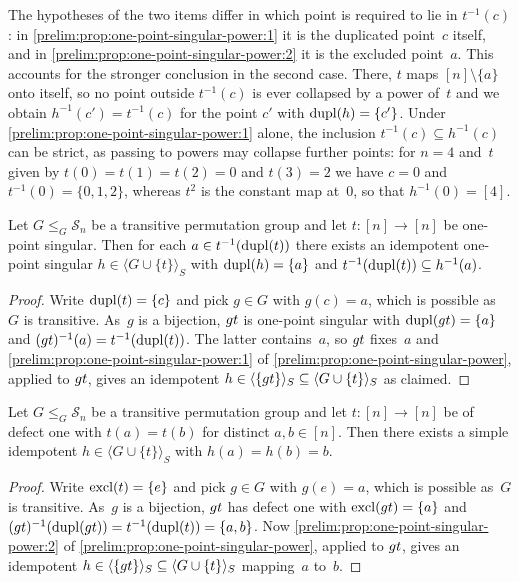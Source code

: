 \begin{remark}
	The hypotheses of the two items differ in which point is required to lie in $t^{-1}(c)$:
	in \cref{prelim:prop:one-point-singular-power:1} it is the duplicated point~$c$ itself, and
	in \cref{prelim:prop:one-point-singular-power:2} it is the excluded point~$a$.
	This accounts for the stronger conclusion in the second case.
	There, $t$ maps $[n] \setminus \{a\}$ onto itself, so no point outside $t^{-1}(c)$ is ever
	collapsed by a power of~$t$ and we obtain $h^{-1}(c') = t^{-1}(c)$ for the point $c'$ with
	$\dupl{h} = \{c'\}$.
	Under \cref{prelim:prop:one-point-singular-power:1} alone, the inclusion
	$t^{-1}(c) \subseteq h^{-1}(c)$ can be strict, as passing to powers may collapse further
	points: for $n = 4$ and~$t$ given by $t(0) = t(1) = t(2) = 0$ and $t(3) = 2$ we have
	$c = 0$ and $t^{-1}(0) = \{0,1,2\}$, whereas $t^2$ is the constant map at~$0$, so that
	$h^{-1}(0) = [4]$.
\end{remark}

\begin{corollary} \label{prelim:lem:transitive-grp-one-point-singular}
	Let $G \le_G \mathcal S_n$ be a transitive permutation group and let $t \colon [n] \to [n]$
	be one-point singular.
	Then for each $a \in t^{-1}(\dupl{t})$ there exists an idempotent one-point singular
	$h \in \langle G \cup \{t\} \rangle_S$ with $\dupl{h} = \{a\}$ and
	$t^{-1}(\dupl{t}) \subseteq h^{-1}(a)$.
\end{corollary}
\begin{proof}
	Write $\dupl{t} = \{c\}$ and pick $g \in G$ with $g(c) = a$, which is possible as~$G$ is transitive.
	As~$g$ is a bijection, $\concat{t}{g}$ is one-point singular with
	$\dupl{\concat{t}{g}} = \{a\}$ and $(\concat{t}{g})^{-1}(a) = t^{-1}(\dupl{t})$.
	The latter contains~$a$, so $\concat{t}{g}$ fixes~$a$ and
	\cref{prelim:prop:one-point-singular-power:1} of
	\cref{prelim:prop:one-point-singular-power}, applied to $\concat{t}{g}$, gives an idempotent
	$h \in \langle \{\concat{t}{g}\} \rangle_S \subseteq \langle G \cup \{t\} \rangle_S$ as
	claimed.
\end{proof}

\begin{corollary}
	\label{sync_words:lem:idempotent}
	Let $G \le_G \mathcal S_n$ be a transitive permutation group and let $t \colon [n] \to [n]$
	be of defect one with $t(a) = t(b)$ for distinct $a,b \in [n]$.
	Then there exists a simple idempotent $h \in \langle G \cup \{t\} \rangle_S$
	with $h(a) = h(b) = b$.
\end{corollary}
\begin{proof}
	Write $\excl{t} = \{e\}$ and pick $g \in G$ with $g(e) = a$, which is possible as~$G$ is transitive.
	As~$g$ is a bijection, $\concat{t}{g}$ has defect one with
	$\excl{\concat{t}{g}} = \{a\}$ and $(\concat{t}{g})^{-1}(\dupl{\concat{t}{g}}) =
	t^{-1}(\dupl{t}) = \{a,b\}$.
	Now \cref{prelim:prop:one-point-singular-power:2} of
	\cref{prelim:prop:one-point-singular-power}, applied to $\concat{t}{g}$, gives an idempotent
	$h \in \langle \{\concat{t}{g}\} \rangle_S \subseteq \langle G \cup \{t\} \rangle_S$
	mapping~$a$ to~$b$.
\end{proof}

